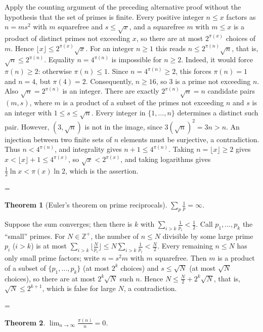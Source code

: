 \documentclass[11pt]{article}
\makeatletter
\theoremstyle{ntstyle}
\newtheorem{theorem}{Theorem}[subsection]
\let\nt@closedisplay\]
\def\nt@guardedclose{\@ifnextchar\par{\nt@closeafterpar}{\@ifnextchar\end{\postdisplaypenalty\@M\nt@closedisplay}{\nt@closedisplay}}}
\def\nt@closeafterpar\par{\@ifnextchar\par{\nt@closeafterpar}{\@ifnextchar\end{\postdisplaypenalty\@M\nt@closedisplay\par}{\nt@closedisplay\par}}}
\renewenvironment{proof}[1][\proofname]{\par
  \pushQED{\qed}\normalfont\topsep\medskipamount\edef\nt@afterproof{\@endparpenalty=\the\@endparpenalty\relax}\@beginparpenalty\@M\@endparpenalty\@M\let\]\nt@guardedclose\trivlist\item[]\textit{#1\@addpunct{.}} \ignorespaces}{\ifvmode\addpenalty\@M\fi\popQED\nt@afterproof\endtrivlist\@endpefalse}
\makeatother
\begin{document}
\begin{proof} Apply the counting argument of the preceding
	alternative proof without the hypothesis that the set of primes is finite.
	Every positive integer $n\le x$ factors as $n=ms^{2}$ with $m$ squarefree and
	$s\le\sqrt{x}$, and a squarefree $m$ with $m \le x$ is a product of distinct
	primes not exceeding $x$, so there are at most $2^{\pi(x)}$ choices of $m$.
	Hence $\lfloor x\rfloor\le 2^{\pi(x)}\sqrt{x}$. For an integer $n\ge1$ this
	reads $n\le 2^{\pi(n)}\sqrt{n}$, that is, $\sqrt{n}\le 2^{\pi(n)}$. Equality $n=4^{\pi(n)}$ is impossible for $n\ge2$.
	Indeed, it would force $\pi(n)\ge2$: otherwise $\pi(n)\le1$.
	Since $n=4^{\pi(n)}\ge2$, this forces $\pi(n)=1$ and $n=4$,
	but $\pi(4)=2$.
	Consequently, $n\ge16$, so $3$ is a prime not exceeding $n$.
	Also $\sqrt n=2^{\pi(n)}$ is an integer. There are exactly
	$2^{\pi(n)}\sqrt n=n$ candidate pairs $(m,s)$, where $m$ is
	a product of a subset of the primes not exceeding $n$ and
	$s$ is an integer with $1\le s\le\sqrt n$.
	Every integer in $\{1,\ldots,n\}$ determines a distinct such pair.
	However, $(3,\sqrt n)$ is not in the image, since
	$3(\sqrt n)^2=3n>n$. An injection between two finite sets of
	$n$ elements must be surjective, a contradiction.
	Thus $n<4^{\pi(n)}$, and integrality gives $n+1\le4^{\pi(n)}$. Taking
	$n=\lfloor x\rfloor\ge2$ gives $x<\lfloor x\rfloor+1\le 4^{\pi(x)}$, so
	$\sqrt{x}<2^{\pi(x)}$, and taking logarithms gives
	$\tfrac12\ln x<\pi(x)\ln 2$, which is the assertion.

\end{proof}
\begin{theorem}[Euler's theorem on prime reciprocals]\label{thm:9.6.2} $\sum_{p} \tfrac{1}{p} = \infty$.

\end{theorem}

\begin{proof} Suppose the sum converges; then there is
	$k$ with $\sum_{i>k}\tfrac{1}{p_i} < \tfrac{1}{2}$. Call $p_1,\ldots,p_k$
	the ``small'' primes. For $N \in \mathbb{Z}^+$, the number of $n \le N$
	divisible by some large prime $p_i$ ($i>k$) is at most
	$\sum_{i>k}\big\lfloor \tfrac{N}{p_i}\big\rfloor \le
		N\sum_{i>k}\tfrac{1}{p_i} < \tfrac{N}{2}$. Every remaining $n \le N$
	has only small prime factors; write $n = s^2 m$ with $m$
	squarefree. Then $m$ is a product of a subset of $\{p_1,\ldots,p_k\}$ (at
	most $2^k$ choices) and $s \le \sqrt{N}$ (at most $\sqrt{N}$ choices),
	so there are at most $2^k\sqrt{N}$ such $n$. Hence $N \le \tfrac{N}{2}
		+ 2^k\sqrt{N}$, that is, $\sqrt{N} \le 2^{k+1}$, which is false for large $N$, a
	contradiction.

\end{proof}
\begin{theorem}\label{thm:9.6.3}
	$\lim_{n\to\infty}\tfrac{\pi(n)}{n} = 0$.

\end{theorem}
\end{document}
